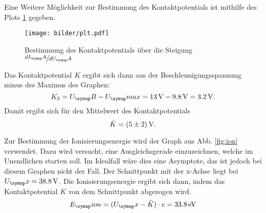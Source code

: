 Eine Weitere Möglichkeit zur Bestimmung des Kontaktpotentials ist mithilfe
des Plots \ref{fig:plot} gegeben.
\begin{figure}
  \centering
  \texttt{[image: bilder/plt.pdf]}
  \caption{Bestimmung des Kontaktpotentials über die Steigung $\sfrac{dI_\su{A}}{dU_\su{A}}$}
  \label{fig:plot}
\end{figure}
Das Kontaktpotential $K$ ergibt sich dann aus der Beschleunigungsspannung minus
des Maximus des Graphen:
\begin{equation}
  K_2 = U_\su{B} - U_\su{max} = 13\Volt - 9.8\Volt = 3.2\Volt.
\end{equation}
Damit ergibt sich für den Mittelwert des Kontaktpotentials
\begin{equation}
  \bar{K} = (5 \pm 2) \,\si{\volt}.
\end{equation}

Zur Bestimmung der Ionisierungsenergie wird der Graph aus Abb. \ref{fig:ion}
verwendet.
Dazu wird versucht, eine Ausgleichsgerade einzuzeichnen, welche im Unendlichen starten
soll. Im Idealfall wäre dies eine Asymptote, das ist jedoch bei diesem Graphen nicht
der Fall. Der Schnittpunkt mit der x-Achse liegt bei $U_\su{x} = 38.8 \Volt$.
Die Ionisierungsenergie ergibt sich dann, indem das Kontaktpotential $K$ von
dem Schnittpunkt abgezogen wird.
\begin{equation}
  E_\su{ion} = (U_\su{x}-\bar{K}) \cdot e = 33.8\eV
\end{equation}
